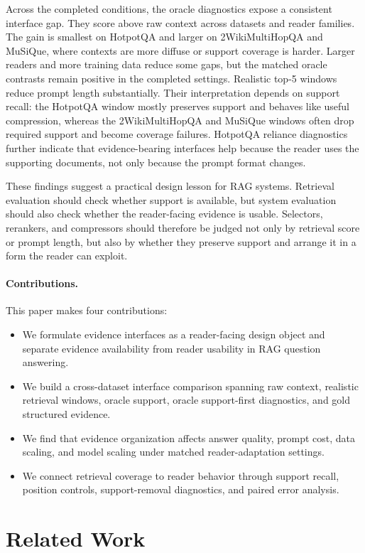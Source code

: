 \documentclass[a4paper,fleqn]{cas-sc}
\begin{document}
Across the completed conditions, the oracle diagnostics expose a consistent
interface gap. They score above raw context across datasets and reader
families. The gain is smallest on HotpotQA and larger on 2WikiMultiHopQA and
MuSiQue, where contexts are more diffuse or support coverage is harder. Larger
readers and more training data reduce some gaps, but the matched oracle
contrasts remain positive in the completed settings. Realistic top-5 windows
reduce prompt length substantially. Their interpretation depends on support
recall: the HotpotQA window mostly preserves support and behaves like useful
compression, whereas the 2WikiMultiHopQA and MuSiQue windows often drop
required support and become coverage failures. HotpotQA reliance diagnostics
further indicate that evidence-bearing interfaces help because the reader uses
the supporting documents, not only because the prompt format changes.

These findings suggest a practical design lesson for RAG systems. Retrieval
evaluation should check whether support is available, but system evaluation
should also check whether the reader-facing evidence is usable. Selectors,
rerankers, and compressors should therefore be judged not only by retrieval
score or prompt length, but also by whether they preserve support and arrange it
in a form the reader can exploit.

\paragraph{Contributions.}
This paper makes four contributions:
\begin{itemize}
\item We formulate evidence interfaces as a reader-facing design object and
separate evidence availability from reader usability in RAG question answering.
\item We build a cross-dataset interface comparison spanning raw context,
realistic retrieval windows, oracle support, oracle support-first diagnostics,
and gold structured evidence.
\item We find that evidence organization affects answer quality, prompt cost,
data scaling, and model scaling under matched reader-adaptation settings.
\item We connect retrieval coverage to reader behavior through support recall,
position controls, support-removal diagnostics, and paired error analysis.
\end{itemize}

\section{Related Work}
\end{document}
